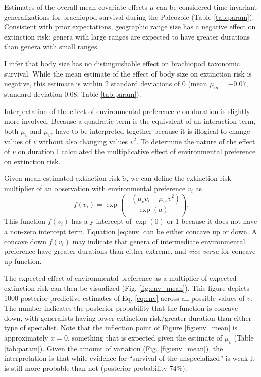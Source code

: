 \documentclass{article}
\begin{document}
Estimates of the overall mean covariate effects \(\mu\) can be considered time-invariant generalizations for brachiopod survival during the Paleozoic (Table \ref{tab:param}). Consistent with prior expectations, geographic range size has a negative effect on extinction risk: genera with large ranges are expected to have greater durations than genera with small ranges. 

I infer that body size has no distinguishable effect on brachiopod taxonomic survival. While the mean estimate of the effect of body size on extinction risk is negative, this estimate is within 2 standard deviations of 0 (mean \(\mu_{m} = -0.07\), standard deviation 0.08; Table \ref{tab:param}). 

Interpretation of the effect of environmental preference \(v\) on duration is slightly more involved. Because a quadratic term is the equivalent of an interaction term, both \(\mu_{v}\) and \(\mu_{v^{2}}\) have to be interpreted together because it is illogical to change values of \(v\) without also changing values \(v^{2}\). To determine the nature of the effect of \(v\) on duration I calculated the multiplicative effect of environmental preference on extinction risk.

Given mean estimated extinction risk \(\tilde{\sigma}\), we can define the extinction risk multiplier of an observation with environmental preference \(v_{i}\) as 
\begin{equation}
  f(v_{i}) = \exp\left(\frac{-(\mu_{v} v_{i} + \mu_{v^{2}} v^{2})}{\exp(a)}\right).
  \label{eq:env}
\end{equation}
This function \(f(v_{i})\) has a y-intercept of \(\exp(0)\) or 1 because it does not have a non-zero intercept term. Equation \ref{eq:env} can be either concave up or down. A concave down \(f(v_{i})\) may indicate that genera of intermediate environmental preference have greater durations than either extreme, and \textit{vice versa} for concave up function.

The expected effect of environmental preference as a multiplier of expected extinction risk can then be visualized (Fig. \ref{fig:env_mean}). This figure depicts 1000 posterior predictive estimates of Eq. \ref{eq:env} across all possible values of \(v\). The number indicates the posterior probability that the function is concave down, with generalists having lower extinction risk/greater duration than either type of specialist. Note that the inflection point of Figure \ref{fig:env_mean} is approximately \(x = 0\), something that is expected given the estimate of \(\mu_{v}\) (Table \ref{tab:param}). Given the amount of variation (Fig. \ref{fig:env_mean}), the interpretation is that while evidence for ``survival of the unspecialized'' is weak it is still more probable than not (posterior probability 74\%).
\end{document}
